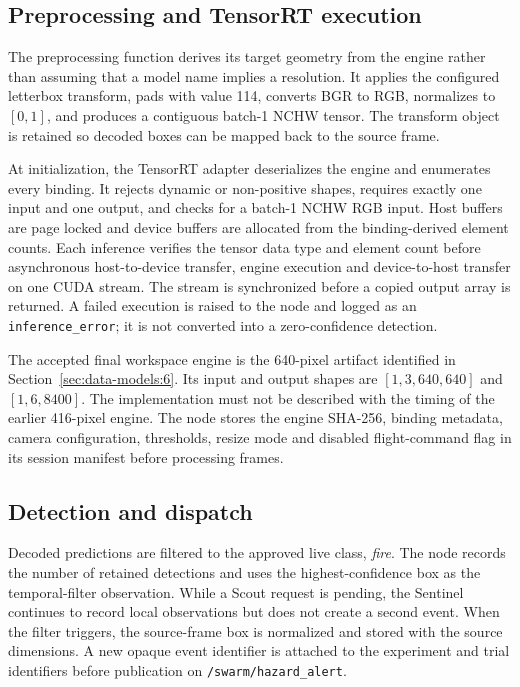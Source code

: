 \subsection{Preprocessing and TensorRT execution}

The preprocessing function derives its target geometry from the engine rather
than assuming that a model name implies a resolution. It applies the configured
letterbox transform, pads with value 114, converts BGR to RGB, normalizes to
$[0,1]$, and produces a contiguous batch-1 NCHW tensor. The transform object is
retained so decoded boxes can be mapped back to the source frame.

At initialization, the TensorRT adapter deserializes the engine and enumerates
every binding. It rejects dynamic or non-positive shapes, requires exactly one
input and one output, and checks for a batch-1 NCHW RGB input. Host buffers are
page locked and device buffers are allocated from the binding-derived element
counts. Each inference verifies the tensor data type and element count before
asynchronous host-to-device transfer, engine execution and device-to-host
transfer on one CUDA stream. The stream is synchronized before a copied output
array is returned. A failed execution is raised to the node and logged as an
\texttt{inference\_error}; it is not converted into a zero-confidence
detection.

The accepted final workspace engine is the 640-pixel artifact identified in
Section~\ref{sec:data-models:6}. Its input and output shapes are
$[1,3,640,640]$ and $[1,6,8400]$. The implementation must not be described with
the timing of the earlier 416-pixel engine. The node stores the engine SHA-256,
binding metadata, camera configuration, thresholds, resize mode and disabled
flight-command flag in its session manifest before processing frames.

\subsection{Detection and dispatch}

Decoded predictions are filtered to the approved live class, \emph{fire}. The
node records the number of retained detections and uses the highest-confidence
box as the temporal-filter observation. While a Scout request is pending, the
Sentinel continues to record local observations but does not create a second
event. When the filter triggers, the source-frame box is normalized and stored
with the source dimensions. A new opaque event identifier is attached to the
experiment and trial identifiers before publication on
\texttt{/swarm/hazard\_alert}.

